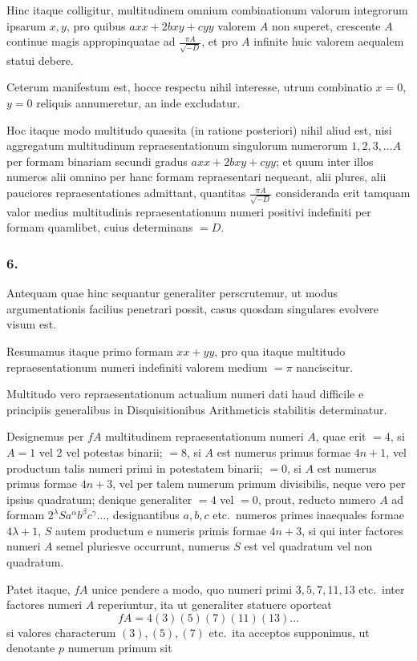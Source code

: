 \documentclass[12pt,a4paper]{article}
\begin{document}
Hinc itaque colligitur, multitudinem omnium combinationum valorum integrorum ipsarum $x, y$, pro quibus $axx+2bxy+cyy$ valorem $A$ non superet, crescente $A$ continue magis appropinquatae ad $\frac{\pi A}{\sqrt{-D}}$, et pro $A$ infinite huic valorem aequalem statui debere.

Ceterum manifestum est, hocce respectu nihil interesse, utrum combinatio $x=0$, $y=0$ reliquis annumeretur, an inde excludatur.

Hoc itaque modo multitudo quaesita (in ratione posteriori) nihil aliud est, nisi aggregatum multitudinum repraesentationum singulorum numerorum $1, 2, 3, \ldots A$ per formam binariam secundi gradus $axx+2bxy+cyy$; et quum inter illos numeros alii omnino per hanc formam repraesentari nequeant, alii plures, alii pauciores repraesentationes admittant, quantitas $\frac{\pi A}{\sqrt{-D}}$ consideranda erit tamquam valor medius multitudinis repraesentationum numeri positivi indefiniti per formam quamlibet, cuius determinans $=D$.

\subsubsection*{6.}

Antequam quae hinc sequantur generaliter perscrutemur, ut modus argumentationis facilius penetrari possit, casus quosdam singulares evolvere visum est.

Resumamus itaque primo formam $xx+yy$, pro qua itaque multitudo repraesentationum numeri indefiniti valorem medium $=\pi$ nanciscitur.

Multitudo vero repraesentationum actualium numeri dati haud difficile e principiis generalibus in Disquisitionibus Arithmeticis stabilitis determinatur.

Designemus per $fA$ multitudinem repraesentationum numeri $A$, quae erit $=4$, si $A=1$ vel $2$ vel potestas binarii; $=8$, si $A$ est numerus primus formae $4n+1$, vel productum talis numeri primi in potestatem binarii; $=0$, si $A$ est numerus primus formae $4n+3$, vel per talem numerum primum divisibilis, neque vero per ipsius quadratum; denique generaliter $=4$ vel $=0$, prout, reducto numero $A$ ad formam $2^\lambda S a^\alpha b^\beta c^\gamma\ldots$, designantibus $a, b, c$ etc.\ numeros primes inaequales formae $4\lambda+1$, $S$ autem productum e numeris primis formae $4n+3$, si qui inter factores numeri $A$ semel pluriesve occurrunt, numerus $S$ est vel quadratum vel non quadratum.

Patet itaque, $fA$ unice pendere a modo, quo numeri primi $3, 5, 7, 11, 13$ etc.\ inter factores numeri $A$ reperiuntur, ita ut generaliter statuere oporteat
\[
fA = 4(3)(5)(7)(11)(13)\ldots
\]
si valores characterum $(3), (5), (7)$ etc.\ ita acceptos supponimus, ut denotante $p$ numerum primum sit
\end{document}
